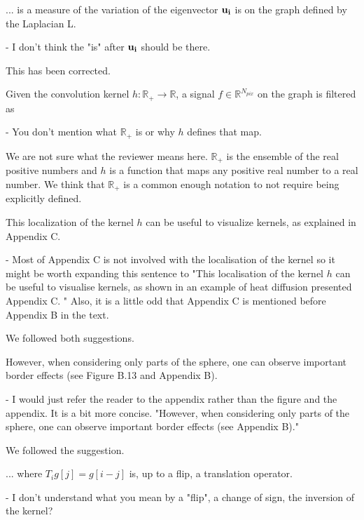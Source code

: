 \documentclass[12pt,a4paper]{article}
\newcommand{\nati}[1]{{\color[rgb]{.1,.6,.1}{NP: #1}}}
\newcommand{\mdeff}[1]{{\color[rgb]{.1,.6,.1}{MD: #1}}}
\newcommand{\1}{\b{1}}              %
\newcommand{\0}{\b{0}}              %
\begin{document}
\begin{mdframed}[style=comment]
... is a measure of the variation of the eigenvector $\bf{u}_i$ is on the graph defined by the Laplacian L.

 - I don't think the "is" after $\bf{u}_i$ should be there.
\end{mdframed}
This has been corrected.

\begin{mdframed}[style=comment]
Given the convolution kernel $h:\mathbb{R}_+ \to \mathbb{R}$, a signal $f\in\mathbb{R}^{N_{pix}}$ on the graph is filtered as

- You don't mention what $\mathbb{R}_+$ is or why $h$ defines that map.
\end{mdframed}
We are not sure what the reviewer means here.
$\mathbb{R}_+$ is the ensemble of the real positive numbers and $h$ is a function that maps any positive real number to a real number.
We think that $\mathbb{R}_+$ is a common enough notation to not require being explicitly defined.


\begin{mdframed}[style=comment]
This localization of the kernel $h$ can be useful to visualize kernels, as explained in Appendix C.

 - Most of Appendix C is not involved with the localisation of the kernel so it might be worth expanding this sentence to "This localisation of the kernel $h$ can be useful to visualise kernels, as shown in an example of heat diffusion presented Appendix C. " Also, it is a little odd that Appendix C is mentioned before Appendix B in the text.
\end{mdframed}
We followed both suggestions.

\begin{mdframed}[style=comment]
However, when considering only parts of the sphere, one can observe important border effects (see Figure B.13 and Appendix B).

- I would just refer the reader to the appendix rather than the figure and the appendix. It is a bit more concise. "However, when considering only parts of the sphere, one can observe important border effects (see Appendix B)."
\end{mdframed}
We followed the suggestion.

\begin{mdframed}[style=comment]
... where $T_ig[j]=g[i-j]$ is, up to a flip, a translation operator.

 - I don't understand what you mean by a "flip", a change of sign, the inversion of the kernel?
\end{mdframed}
\end{document}
